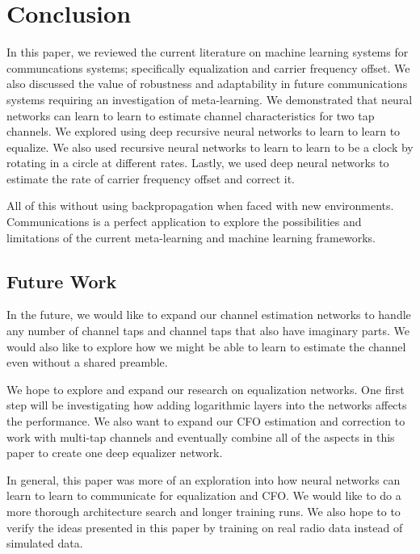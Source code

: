 \chapter{Conclusion}

In this paper, we reviewed the current literature on machine learning systems for communcations systems; specifically equalization and carrier frequency offset.  We also discussed the value of robustness and adaptability in future communications systems requiring an investigation of meta-learning.
We demonstrated that neural networks can learn to learn to estimate channel characteristics for two tap channels.  We explored using deep recursive neural networks to learn to learn to equalize.
We also used recursive neural networks to learn to learn to be a clock by rotating in a circle at different rates.  Lastly, we used deep neural networks to estimate the rate of carrier frequency offset and correct it.

All of this without using backpropagation when faced with new environments.
Communications is a perfect application to explore the possibilities and limitations of the current meta-learning and machine learning frameworks.  


\section{Future Work}

In the future, we would like to expand our channel estimation networks to handle any number of channel taps and channel taps that also have imaginary parts.
We would also like to explore how we might be able to learn to estimate the channel even without a shared preamble.

We hope to explore and expand our research on equalization networks.  One first step will be investigating how adding logarithmic layers into the networks affects the performance.  We also want to expand our CFO estimation and correction to work with multi-tap channels and eventually combine all of the aspects in this paper to create one deep equalizer network.

In general, this paper was more of an exploration into how neural networks can learn to learn to communicate for equalization and CFO.  We would like to do a more thorough architecture search and longer training runs.  We also hope to to verify the ideas presented in this paper by training on real radio data instead of simulated data.